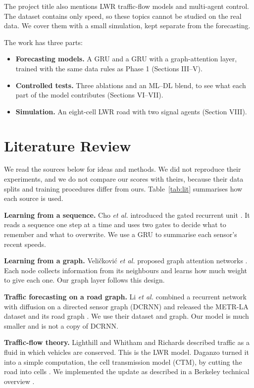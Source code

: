 \documentclass[conference]{IEEEtran}
\begin{document}
The project title also mentions LWR traffic-flow models and multi-agent control. The dataset contains only speed, so these topics cannot be studied on the real data. We cover them with a small simulation, kept separate from the forecasting.

The work has three parts:
\begin{itemize}
\item \textbf{Forecasting models.} A GRU and a GRU with a graph-attention layer, trained with the same data rules as Phase 1 (Sections III--V).
\item \textbf{Controlled tests.} Three ablations and an ML--DL blend, to see what each part of the model contributes (Sections VI--VII).
\item \textbf{Simulation.} An eight-cell LWR road with two signal agents (Section VIII).
\end{itemize}

\section{Literature Review}
We read the sources below for ideas and methods. We did not reproduce their experiments, and we do not compare our scores with theirs, because their data splits and training procedures differ from ours. Table~\ref{tab:lit} summarises how each source is used.

\textbf{Learning from a sequence.} Cho \emph{et al.} introduced the gated recurrent unit \cite{cho}. It reads a sequence one step at a time and uses two gates to decide what to remember and what to overwrite. We use a GRU to summarise each sensor's recent speeds.

\textbf{Learning from a graph.} Veli\v{c}kovi\'c \emph{et al.} proposed graph attention networks \cite{gat}. Each node collects information from its neighbours and learns how much weight to give each one. Our graph layer follows this design.

\textbf{Traffic forecasting on a road graph.} Li \emph{et al.} combined a recurrent network with diffusion on a directed sensor graph (DCRNN) and released the METR-LA dataset and its road graph \cite{dcrnn}. We use their dataset and graph. Our model is much smaller and is not a copy of DCRNN.

\textbf{Traffic-flow theory.} Lighthill and Whitham \cite{lw} and Richards \cite{richards} described traffic as a fluid in which vehicles are conserved. This is the LWR model. Daganzo turned it into a simple computation, the cell transmission model (CTM), by cutting the road into cells \cite{ctm}. We implemented the update as described in a Berkeley technical overview \cite{ctmoverview}.
\end{document}
